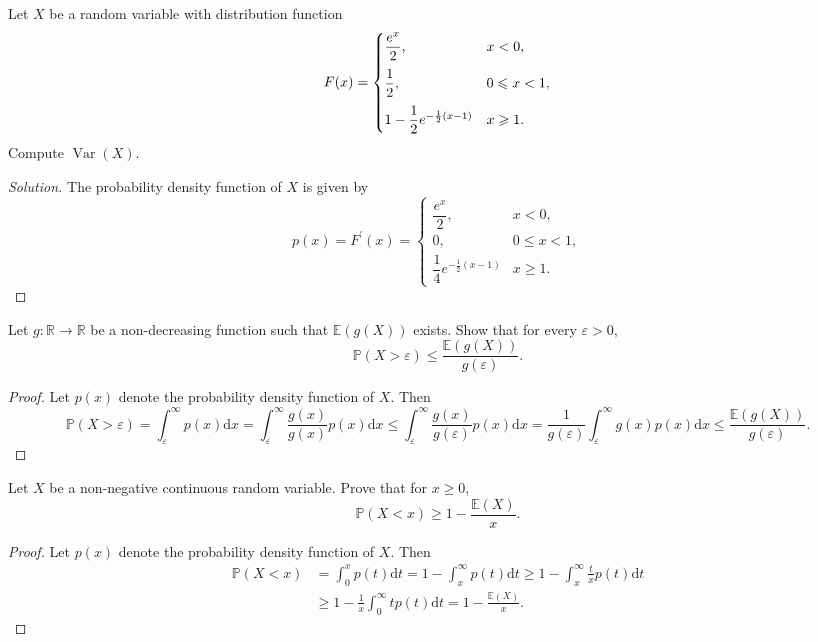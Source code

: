 \documentclass[11pt,singlecolumn, openany, citestyle=authoryear]{elegantbook}
\begin{document}
\begin{CJK}{UTF8}{gbsn}
\begin{exercise}
    Let $X$ be a random variable with distribution function 
    $$
    F(x)=
    \begin{cases}
        \vspace{1.5ex}
        \dfrac{e^x}{2}, &x<0,\\
        \vspace{1.5ex}
        \dfrac{1}{2}, &0\leqslant x<1,\\
        1-\dfrac{1}{2}e^{-\frac{1}{2}(x-1)} &x\geqslant 1.
    \end{cases}
    $$
    Compute $\operatorname{Var}(X)$.
\end{exercise}
\begin{proof}[Solution]
    The probability density function of $X$ is given by 
    $$p(x)=
    F^\prime(x)=
    \begin{cases}
        \dfrac{e^x}{2}, &x<0,\\
        0, &0\leqslant x<1,\\
        \dfrac{1}{4}e^{-\frac{1}{2}(x-1)} &x\geqslant 1.
    \end{cases}
    $$
\end{proof}

\begin{exercise}
    Let $g:\mathbb{R}\to\mathbb{R}$ be a non-decreasing function such that 
    $\mathbb{E}(g(X))$ exists. Show that for every $\varepsilon>0$,
    $$
    \mathbb{P}(X>\varepsilon)\leqslant\frac{\mathbb{E}(g(X))}{g(\varepsilon)}.
    $$  
\end{exercise}
\begin{proof}
    Let $p(x)$ denote the probability density function of $X$. Then 
    $$
    \mathbb{P}(X>\varepsilon)=\int_{\varepsilon}^\infty p(x)\mathrm{d}x = 
    \int_{\varepsilon}^\infty \frac{g(x)}{g(x)}p(x)\mathrm{d}x\leqslant 
    \int_{\varepsilon}^\infty \frac{g(x)}{g(\varepsilon)} p(x)\mathrm{d}x
    = \frac{1}{g(\varepsilon)}\int_{\varepsilon}^\infty g(x)p(x)\mathrm{d}x
    \leqslant \frac{\mathbb{E}(g(X))}{g(\varepsilon)}.
    $$
\end{proof}
\begin{exercise}
    Let $X$ be a non-negative continuous random variable. Prove that for $x\geqslant 0$,
    $$
    \mathbb{P}(X<x)\geqslant 1-\frac{\mathbb{E}(X)}{x}.
    $$
\end{exercise}
\begin{proof}
    Let $p(x)$ denote the probability density function of $X$. Then 
    \begin{align*}
        \mathbb{P}(X<x)&=\int_{0}^x p(t)\mathrm{d}t = 1 - \int_x^\infty p(t)\mathrm{d}t 
        \geqslant 1-\int_{x}^\infty \frac{t}{x}p(t)\mathrm{d}t \\
        &\geqslant 1-\frac{1}{x}\int_{0}^\infty tp(t)\mathrm{d}t = 1-\frac{\mathbb{E}(X)}{x}.
    \end{align*} 
\end{proof}



\end{CJK}
\end{document}
